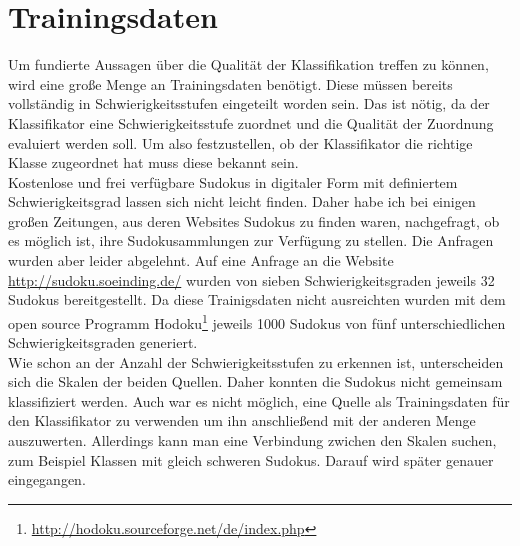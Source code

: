 \chapter{Trainingsdaten}
Um fundierte Aussagen über die Qualität der Klassifikation treffen zu können, wird eine große Menge an Trainingsdaten benötigt. Diese müssen bereits vollständig in Schwierigkeitsstufen eingeteilt worden sein. Das ist nötig, da der Klassifikator eine Schwierigkeitsstufe zuordnet und die Qualität der Zuordnung evaluiert werden soll. Um also festzustellen, ob der Klassifikator die richtige Klasse zugeordnet hat muss diese bekannt sein.\\
Kostenlose und frei verfügbare Sudokus in digitaler Form mit definiertem Schwierigkeitsgrad lassen sich nicht leicht finden. Daher habe ich bei einigen großen Zeitungen, aus deren Websites Sudokus zu finden waren, nachgefragt, ob es möglich ist, ihre Sudokusammlungen zur Verfügung zu stellen. Die Anfragen wurden aber leider abgelehnt. Auf eine Anfrage an die Website \url{http://sudoku.soeinding.de/} wurden von sieben Schwierigkeitsgraden jeweils 32 Sudokus bereitgestellt. Da diese Trainigsdaten nicht ausreichten wurden mit dem open source Programm Hodoku\footnote{\url{http://hodoku.sourceforge.net/de/index.php}} jeweils 1000 Sudokus von fünf unterschiedlichen Schwierigkeitsgraden generiert.\\
Wie schon an der Anzahl der Schwierigkeitsstufen zu erkennen ist, unterscheiden sich die Skalen der beiden Quellen. Daher konnten die Sudokus nicht gemeinsam klassifiziert werden. Auch war es nicht möglich, eine Quelle als Trainingsdaten für den Klassifikator zu verwenden um ihn anschließend mit der anderen Menge auszuwerten. Allerdings kann man eine Verbindung zwichen den Skalen suchen, zum Beispiel Klassen mit gleich schweren Sudokus. Darauf wird später genauer eingegangen.\\